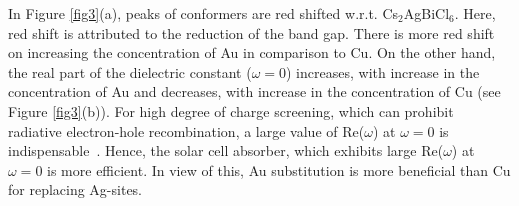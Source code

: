 \documentclass[journal=jpclcd,manuscript=letter]{achemso}
\begin{document}
In Figure \ref{fig3}(a), peaks of conformers are red shifted w.r.t. Cs$_2$AgBiCl$_6$. Here, red shift is attributed to the reduction of the band gap. There is more red shift on increasing the concentration of Au in comparison to Cu. On the other hand, the real part of the dielectric constant ($\omega=0$) increases, with increase in the concentration of Au and decreases, with increase in the concentration of Cu (see Figure \ref{fig3}(b)). For high degree of charge screening, which can prohibit radiative electron-hole recombination, a large value of Re($\omega$) at $\omega=0$ is indispensable~\cite{basera2019self}. Hence, the solar cell absorber, which exhibits large Re($\omega$) at $\omega=0$ is more efficient. In view of this, Au substitution is more beneficial than Cu for replacing Ag-sites.
\end{document}
